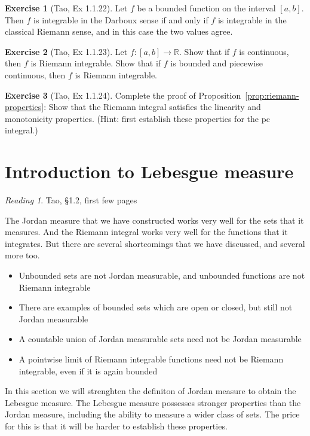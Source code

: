 \documentclass[11pt,oneside]{amsbook}
\newcommand{\RR}{{\mathbb R}}
\theoremstyle{definition}
\newtheorem{exerc}{Exercise}[section]
\theoremstyle{plain}
\theoremstyle{definition}
\theoremstyle{remark}
\newtheorem*{reading}{Reading}
\numberwithin{equation}{section}
\numberwithin{figure}{section}
\begin{document}
\begin{exerc}[Tao, Ex 1.1.22]
  Let $f$ be a bounded function on the interval $[a,b]$. Then $f$ is integrable in the Darboux sense if and only if $f$ is integrable in the classical Riemann sense, and in this case the two values agree.
\end{exerc}

\begin{exerc}[Tao, Ex 1.1.23]
  Let $f\colon[a,b]\to\RR$. Show that if $f$ is continuous, then $f$ is Riemann integrable. Show that if $f$ is bounded and piecewise continuous, then $f$ is Riemann integrable.
\end{exerc}

\begin{exerc}[Tao, Ex 1.1.24]
  Complete the proof of Proposition~\ref{prop:riemann-properties}: Show that the Riemann integral satisfies the linearity and monotonicity properties. (Hint: first establish these properties for the pc integral.)
\end{exerc}

\newpage
\section{Introduction to Lebesgue measure}

\begin{reading}
  Tao, \S1.2, first few pages
\end{reading}

The Jordan measure that we have constructed works very well for the sets that it measures. And the Riemann integral works very well for the functions that it integrates. But there are several shortcomings that we have discussed, and several more too.
\begin{itemize}
\item Unbounded sets are not Jordan measurable, and unbounded functions are not Riemann integrable
\item There are examples of bounded sets which are open or closed, but still not Jordan measurable
\item A countable union of Jordan measurable sets need not be Jordan measurable
\item A pointwise limit of Riemann integrable functions need not be Riemann integrable, even if it is again bounded
\end{itemize}

In this section we will strenghten the definiton of Jordan measure to obtain the Lebesgue measure. The Lebesgue measure possesses stronger properties than the Jordan measure, including the ability to measure a wider class of sets. The price for this is that it will be harder to establish these properties.
\end{document}
